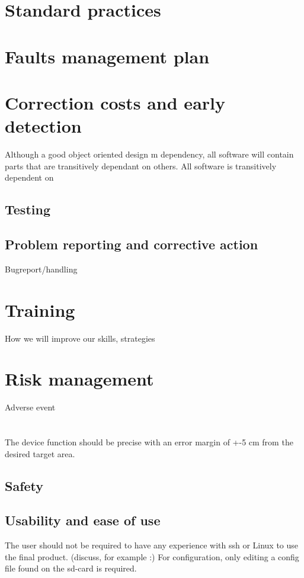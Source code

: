 \documentclass{article}
\begin{document}
\section{Standard practices}
\section{Faults management plan}
\section{Correction costs and early detection}
Although a good object oriented design m dependency, all software will contain parts that are transitively dependant on others.
All software is transitively dependent on 


\subsection{Testing}
\subsection{Problem reporting and corrective action}
Bugreport/handling
\section{Training}
How we will improve our skills, strategies
\section{Risk management}
Adverse event
\section{}

The device function should be precise with an error margin of +-5 cm from the desired target area. 



\subsection{Safety}

\subsection{Usability and ease of use}
The user should not be required to have any experience with ssh or Linux to use the final product. (discuss, for example :) For configuration, only editing a config file found on the sd-card is required.
\end{document}
